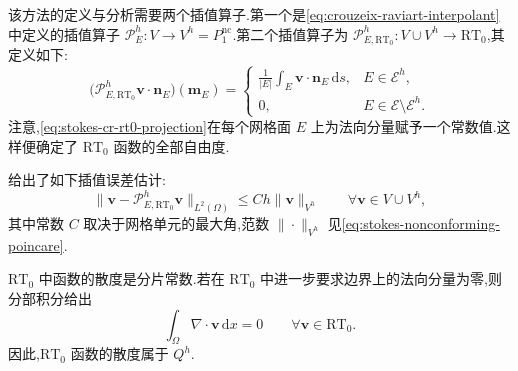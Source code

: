 \begin{note}[插值算子]\label{note:stokes-pressure-robust-interpolation}
该方法的定义与分析需要两个插值算子.第一个是\cref{eq:crouzeix-raviart-interpolant}中定义的插值算子 $\mathcal{P}_E^h:V\to V^h=P_1^{\mathrm{nc}}$.第二个插值算子为
$\mathcal{P}_{E,\mathrm{RT}_0}^h:V\cup V^h\to\mathrm{RT}_0$,其定义如下:
\begin{equation}\label{eq:stokes-cr-rt0-projection}
  \bigl(\mathcal{P}_{E,\mathrm{RT}_0}^h\bm{v}\cdot\bm{n}_E\bigr)(\bm{m}_E)
  =
  \begin{cases}
    \displaystyle\frac{1}{|E|}\int_E\bm{v}\cdot\bm{n}_E\,\mathrm{d}s,
      & E\in\mathcal{E}^h,\\[6pt]
    0,& E\in\mathcal{E}\setminus\mathcal{E}^h.
  \end{cases}
\end{equation}
注意,\cref{eq:stokes-cr-rt0-projection}在每个网格面 $E$ 上为法向分量赋予一个常数值.这样便确定了 $\mathrm{RT}_0$ 函数的全部自由度.

\textcite{AcostaDuran1999} 给出了如下插值误差估计:
\begin{equation}\label{eq:stokes-cr-rt0-interpolation-estimate}
  \|\bm{v}-\mathcal{P}_{E,\mathrm{RT}_0}^h\bm{v}\|_{L^2(\Omega)}
  \leq Ch\|\bm{v}\|_{V^h}
  \qquad\forall\bm{v}\in V\cup V^h,
\end{equation}
其中常数 $C$ 取决于网格单元的最大角,范数 $\|\cdot\|_{V^h}$ 见\cref{eq:stokes-nonconforming-poincare}.

$\mathrm{RT}_0$ 中函数的散度是分片常数.若在 $\mathrm{RT}_0$ 中进一步要求边界上的法向分量为零,则分部积分给出
\[
  \int_\Omega\nabla\cdot\bm{v}\,\mathrm{d}x=0
  \qquad\forall\bm{v}\in\mathrm{RT}_0.
\]
因此,$\mathrm{RT}_0$ 函数的散度属于 $Q^h$.
\end{note}

